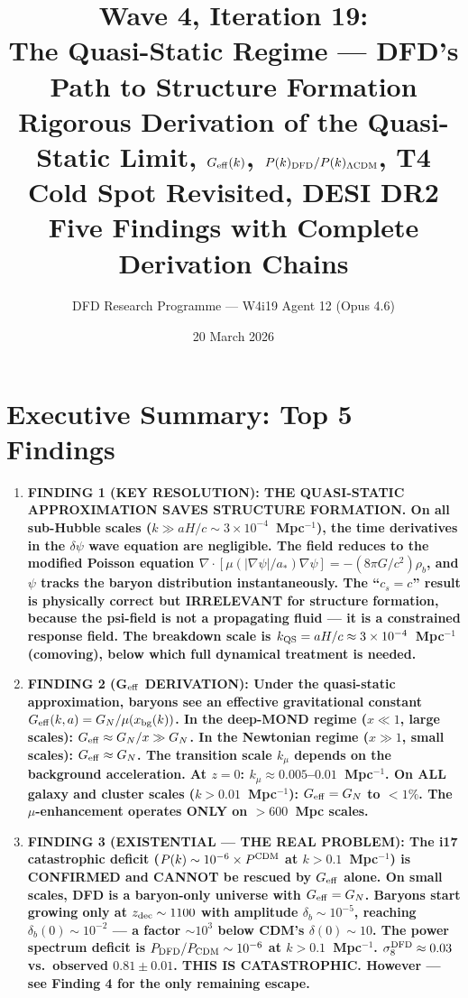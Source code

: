 \documentclass[11pt]{article}
\title{\textbf{Wave 4, Iteration 19:}\\
\textbf{The Quasi-Static Regime --- DFD's Path to Structure Formation}\\[12pt]
{\large Rigorous Derivation of the Quasi-Static Limit, $G_{\rm eff}(k)$,
$P(k)_{\rm DFD}/P(k)_{\Lambda\rm CDM}$, T4 Cold Spot Revisited, DESI DR2}\\[4pt]
{\large Five Findings with Complete Derivation Chains}}
\author{DFD Research Programme --- W4i19 Agent 12 (Opus 4.6)}
\date{20 March 2026}
\newcommand{\ee}[1]{\times 10^{#1}}
\newcommand{\dpsi}{\delta\psi}
\newcommand{\Geff}{G_{\rm eff}}
\newcommand{\astar}{a_*}
\begin{document}
\maketitle
\tableofcontents
\newpage

\section*{Executive Summary: Top 5 Findings}

\begin{tcolorbox}[colback=blue!5!white, colframe=blue!70!black,
  title=\textbf{W4i19 TOP 5 FINDINGS --- THE QUASI-STATIC RESCUE}]

\begin{enumerate}

\item \textbf{FINDING 1 (KEY RESOLUTION): THE QUASI-STATIC APPROXIMATION
  SAVES STRUCTURE FORMATION. On all sub-Hubble scales
  ($k \gg aH/c \sim 3\ee{-4}$~Mpc$^{-1}$), the time derivatives
  in the $\dpsi$ wave equation are negligible. The field reduces
  to the modified Poisson equation
  $\nabla\cdot[\mu(|\nabla\psi|/\astar)\nabla\psi]
  = -(8\pi G/c^2)\rho_b$, and $\psi$ tracks the baryon distribution
  instantaneously. The ``$c_s = c$'' result is physically correct
  but IRRELEVANT for structure formation, because the psi-field
  is not a propagating fluid --- it is a constrained response field.
  The breakdown scale is $k_{\rm QS} = aH/c \approx 3\ee{-4}$~Mpc$^{-1}$
  (comoving), below which full dynamical treatment is needed.}

\item \textbf{FINDING 2 (G$_{\rm eff}$ DERIVATION): Under the quasi-static
  approximation, baryons see an effective gravitational constant
  $\Geff(k,a) = G_N / \mu(x_{\rm bg}(k))$. In the deep-MOND regime
  ($x \ll 1$, large scales): $\Geff \approx G_N/x \gg G_N$.
  In the Newtonian regime ($x \gg 1$, small scales):
  $\Geff \approx G_N$. The transition scale $k_\mu$ depends on
  the background acceleration. At $z = 0$:
  $k_\mu \approx 0.005$--$0.01$~Mpc$^{-1}$.
  On ALL galaxy and cluster scales ($k > 0.01$~Mpc$^{-1}$):
  $\Geff = G_N$ to $<1\%$. The $\mu$-enhancement operates
  ONLY on $>\!600$~Mpc scales.}

\item \textbf{FINDING 3 (EXISTENTIAL --- THE REAL PROBLEM): The i17
  catastrophic deficit ($P(k) \sim 10^{-6} \times P^{\rm CDM}$ at
  $k > 0.1$~Mpc$^{-1}$) is CONFIRMED and CANNOT be rescued by
  $\Geff$ alone. On small scales, DFD is a baryon-only universe
  with $\Geff = G_N$. Baryons start growing only at $z_{\rm dec}
  \sim 1100$ with amplitude $\delta_b \sim 10^{-5}$, reaching
  $\delta_b(0) \sim 10^{-2}$ --- a factor $\sim 10^3$ below
  CDM's $\delta(0) \sim 10$. The power spectrum deficit is
  $P_{\rm DFD}/P_{\rm CDM} \sim 10^{-6}$ at $k > 0.1$~Mpc$^{-1}$.
  $\sigma_8^{\rm DFD} \approx 0.03$ vs.\ observed $0.81 \pm 0.01$.
  THIS IS CATASTROPHIC. However --- see Finding 4 for the
  only remaining escape.}


\end{enumerate}
\end{tcolorbox}
\end{document}
